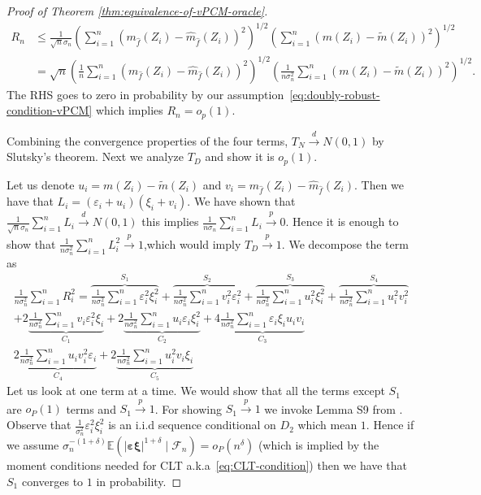 \documentclass[12pt]{article}
\theoremstyle{definition}
\theoremstyle{remark}
\newcommand{\E}{\mathbb E}								%
\newcommand{\convd}{\overset d \rightarrow}             %
\newcommand{\srz}{Z}									%
\begin{document}
\begin{proof}[Proof of Theorem \ref{thm:equivalence-of-vPCM-oracle}]
	\begin{align*}
		R_n &\leq \frac{1}{\sqrt n \sigma_n} \left(\sum_{i=1}^n (m_{\widehat f}(\srz_i) -\widehat m_{\widehat f}(\srz_i))^2\right)^{1/2} \left(\sum_{i=1}^n( m(\srz_i) - \widetilde m(\srz_i))^2\right)^{1/2}\\
		&= \sqrt n \left(\frac{1}{n}\sum_{i=1}^n (m_{\widehat f}(\srz_i) -\widehat m_{\widehat f}(\srz_i))^2\right)^{1/2} \left(\frac{1}{ n \sigma^2_n}\sum_{i=1}^n( m(\srz_i) - \widetilde m(\srz_i))^2\right)^{1/2}.
	\end{align*}
	The RHS goes to zero in probability by our assumption~\eqref{eq:doubly-robust-condition-vPCM} which implies $R_n = o_p(1)$.
	
	Combining the convergence properties of the four terms,  $T_N \convd N(0,1)$ by Slutsky's theorem. Next we analyze $T_D$ and show it is $o_p(1)$.
	
	Let us denote $u_i = m(\srz_i) - \widetilde m(\srz_i)$ and $v_i = m_{\widehat f}(\srz_i) -  \widehat m_{\widehat f}(\srz_i)$. Then we have that $L_i = (\varepsilon_i + u_i)(\xi_i + v_i)$. We have shown that $\frac{1}{\sqrt n \sigma_n} \sum_{i=1}^n L_i \overset{d}{\to} N(0,1)$ this implies $\frac{1}{n \sigma_n} \sum_{i=1}^n L_i \overset{p}{\to} 0$. Hence it is enough to show that $\frac{1}{n \sigma^2_n} \sum_{i=1}^n L^2_i \overset{p}{\to} 1$,which would imply $T_D \overset{p}{\to} 1$. We decompose the term as
	\begin{gather*}
		\frac{1}{n \sigma^2_n} \sum_{i=1}^n R^2_i = \overbrace{\frac{1}{n\sigma_n^2} \sum_{i=1}^n \varepsilon_i^2\xi^2_i}^{S_1} +  \overbrace{\frac{1}{n\sigma_n^2} \sum_{i=1}^n v_i^2\varepsilon_i^2}^{S_2} + \overbrace{ \frac{1}{n\sigma_n^2} \sum_{i=1}^n u_i^2\xi^2_i}^{S_3} + \overbrace{ \frac{1}{n\sigma_n^2} \sum_{i=1}^n u_i^2v_i^2}^{S_4} \\
		+ 2\underbrace{\frac{1}{n\sigma_n^2} \sum_{i=1}^n v_i\varepsilon_i^2\xi_i}_{C_1} + 2\underbrace{ \frac{1}{n\sigma_n^2} \sum_{i=1}^n u_i \varepsilon_i\xi^2_i}_{C_2} + 4\underbrace{ \frac{1}{n\sigma_n^2} \sum_{i=1}^n \varepsilon_i\xi_iu_iv_i}_{C_3}	\\
		2\underbrace{\frac{1}{n\sigma_n^2} \sum_{i=1}^n u_iv^2_i\varepsilon_i}_{C_4} + 2\underbrace{ \frac{1}{n\sigma_n^2} \sum_{i=1}^n u^2_iv_i \xi_i}_{C_5} 
	\end{gather*}
	Let us look at one term at a time. We would show that all the terms except $S_1$ are $o_P(1)$ terms and $S_1 \overset{p}{\to}  1$. For showing $S_1 \overset{p}{\to} 1$ we invoke Lemma S9 from \citep{Lundborg2022a}. Observe that $\frac{1}{\sigma^2_n} \varepsilon_i^2\xi_i^2$ is an i.i.d sequence conditional on $D_2$ which mean $1$. Hence if we assume $\sigma_n^{-{(1+\delta)}} \E\left(|\bm\varepsilon\bm\xi|^{1+\delta} \mid \mathcal{F}_n\right) = o_P(n^{\delta})$ (which is implied by the moment conditions needed for CLT a.k.a~\eqref{eq:CLT-condition}) then we have that $S_1$ converges to $1$ in probability.
	

\end{proof}
\end{document}
